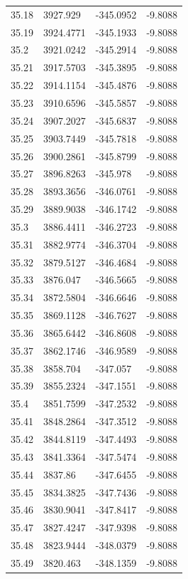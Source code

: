 \begin{table}[H]
\begin{tabular}{llll}
35.18 & 3927.929 & -345.0952 & -9.8088 \\
35.19 & 3924.4771 & -345.1933 & -9.8088 \\
35.2 & 3921.0242 & -345.2914 & -9.8088 \\
35.21 & 3917.5703 & -345.3895 & -9.8088 \\
35.22 & 3914.1154 & -345.4876 & -9.8088 \\
35.23 & 3910.6596 & -345.5857 & -9.8088 \\
35.24 & 3907.2027 & -345.6837 & -9.8088 \\
35.25 & 3903.7449 & -345.7818 & -9.8088 \\
35.26 & 3900.2861 & -345.8799 & -9.8088 \\
35.27 & 3896.8263 & -345.978 & -9.8088 \\
35.28 & 3893.3656 & -346.0761 & -9.8088 \\
35.29 & 3889.9038 & -346.1742 & -9.8088 \\
35.3 & 3886.4411 & -346.2723 & -9.8088 \\
35.31 & 3882.9774 & -346.3704 & -9.8088 \\
35.32 & 3879.5127 & -346.4684 & -9.8088 \\
35.33 & 3876.047 & -346.5665 & -9.8088 \\
35.34 & 3872.5804 & -346.6646 & -9.8088 \\
35.35 & 3869.1128 & -346.7627 & -9.8088 \\
35.36 & 3865.6442 & -346.8608 & -9.8088 \\
35.37 & 3862.1746 & -346.9589 & -9.8088 \\
35.38 & 3858.704 & -347.057 & -9.8088 \\
35.39 & 3855.2324 & -347.1551 & -9.8088 \\
35.4 & 3851.7599 & -347.2532 & -9.8088 \\
35.41 & 3848.2864 & -347.3512 & -9.8088 \\
35.42 & 3844.8119 & -347.4493 & -9.8088 \\
35.43 & 3841.3364 & -347.5474 & -9.8088 \\
35.44 & 3837.86 & -347.6455 & -9.8088 \\
35.45 & 3834.3825 & -347.7436 & -9.8088 \\
35.46 & 3830.9041 & -347.8417 & -9.8088 \\
35.47 & 3827.4247 & -347.9398 & -9.8088 \\
35.48 & 3823.9444 & -348.0379 & -9.8088 \\
35.49 & 3820.463 & -348.1359 & -9.8088 \\

\end{tabular}
\end{table}
